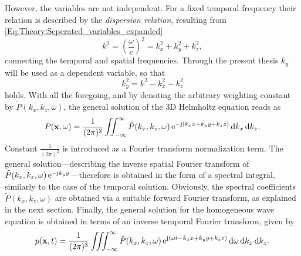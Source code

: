 However, the variables are not independent. 
For a fixed temporal frequency their relation is described by the \emph{dispersion relation}, resulting from \eqref{Eq:Theory:Seperated_variables_expanded}
\begin{equation}
\label{Eq:Theory:dispersion_relation}
k^2 = \left( \frac{\omega}{c} \right)^2 = k_x^2 + k_y^2 + k_z^2,
\end{equation}
connecting the temporal and spatial frequencies.
Through the present thesis $k_y$ will be used as a dependent variable, so that
\begin{equation}
k_y^2 = k^2 - k_x^2 - k_z^2
\end{equation}
holds.
With all the foregoing, and by denoting the arbitrary weighting constant by $\tilde{P}(k_x,k_z, \omega)$, the general solution of the 3D Helmholtz equation reads as
\begin{equation}
P(\mathbf{x},\omega) = \frac{1}{(2\pi)^2}\iint_{-\infty}^{\infty} \tilde{P}(k_x,k_z, \omega) \, \mathrm{e}^{- \mathrm{j} \left( k_x x + k_y y + k_z z \right) }
\, \mathrm{d} k_x\, \mathrm{d} k_z.
\label{Eq:Theory:Helmholtz_Inverse_Fourier}
\end{equation}
Constant $\frac{1}{(2\pi)^2}$ is introduced as a Fourier transform normalization term. 
The general solution---describing the inverse spatial Fourier transform of $\tilde{P}(k_x,k_z, \omega) \, \mathrm{e}^{- \mathrm{j} k_y y }$---therefore is obtained in the form of a spectral integral, similarly to the case of the temporal solution.
Obviously, the spectral coefficients $\tilde{P}(k_x,k_z, \omega)$ are obtained via a suitable forward Fourier transform, as explained in the next section.
Finally, the general solution for the homogeneous wave equation is obtained in terms of an inverse temporal Fourier transform, given by
\begin{equation}
p(\mathbf{x},t) = \frac{1}{(2\pi)^3}\iiint_{-\infty}^{\infty} \tilde{P}(k_x,k_z, \omega) \, \mathrm{e}^{ \mathrm{j} \left( \omega t - k_x x + k_y y + k_z z \right) }\, \mathrm{d} \omega
\, \mathrm{d} k_x\, \mathrm{d} k_z.
\label{Eq:Theory:Wave_eq_Inverse_Fourier}
\end{equation}


